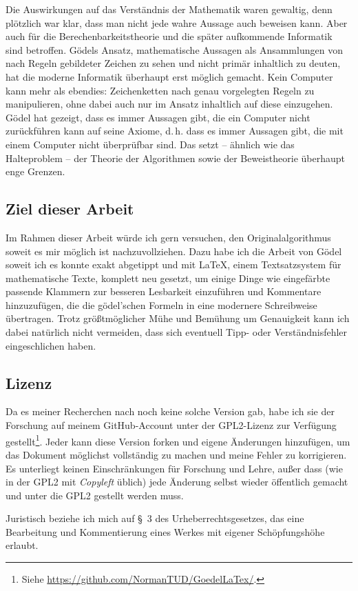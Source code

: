 Die Auswirkungen auf das Verständnis der Mathematik waren gewaltig, denn plötzlich war klar,
dass man nicht jede wahre Aussage auch beweisen kann. Aber auch für die Berechenbarkeitstheorie
und die später aufkommende Informatik sind betroffen. Gödels Ansatz, mathematische
Aussagen als Ansammlungen von nach Regeln gebildeter Zeichen zu sehen und nicht primär
inhaltlich zu deuten, hat die moderne Informatik überhaupt erst möglich gemacht.
Kein Computer kann mehr als ebendies: Zeichenketten nach genau vorgelegten Regeln
zu manipulieren, ohne dabei auch nur im Ansatz inhaltlich auf diese einzugehen. Gödel hat
gezeigt, dass es immer Aussagen gibt, die ein Computer nicht zurückführen kann auf
seine Axiome, d.\,h. dass es immer Aussagen gibt, die mit einem Computer nicht überprüfbar sind.
Das setzt -- ähnlich wie das Halteproblem -- der Theorie der Algorithmen sowie
der Beweistheorie überhaupt enge Grenzen.

\subsection*{Ziel dieser Arbeit}

Im Rahmen dieser Arbeit würde ich gern versuchen, den Originalalgorithmus soweit
es mir möglich ist nachzuvollziehen. Dazu habe ich die Arbeit von Gödel soweit ich 
es konnte exakt abgetippt und mit \LaTeX, einem Textsatzsystem für mathematische
Texte, komplett neu gesetzt, um einige Dinge wie eingefärbte passende Klammern zur besseren 
Lesbarkeit einzuführen und Kommentare hinzuzufügen, die die gödel'schen Formeln in eine modernere
Schreibweise übertragen. Trotz größtmöglicher Mühe und Bemühung um Genauigkeit
kann ich dabei natürlich nicht vermeiden, dass sich eventuell Tipp- oder Verständnisfehler 
eingeschlichen haben.

\subsection*{Lizenz}

Da es meiner Recherchen nach noch keine solche Version gab, habe ich sie der
Forschung auf meinem GitHub-Account unter der GPL2-Lizenz zur Verfügung 
gestellt\footnote{Siehe \url{https://github.com/NormanTUD/GoedelLaTex/}.}.
Jeder kann diese Version forken und eigene Änderungen hinzufügen, um das
Dokument möglichst vollständig zu machen und meine Fehler zu korrigieren.
Es unterliegt keinen Einschränkungen für Forschung und Lehre, außer dass 
(wie in der GPL2 mit \textit{Copyleft} üblich) jede Änderung selbst wieder
öffentlich gemacht und unter die GPL2 gestellt werden muss.

Juristisch beziehe ich mich auf §~3 des Urheberrechtsgesetzes, das eine
Bearbeitung und Kommentierung eines Werkes mit eigener Schöpfungshöhe
erlaubt.

\newpage
{}
\setcounter{footnote}{0}
\setcounter{page}{173}
\let\thefootnote\originalthefootnote
